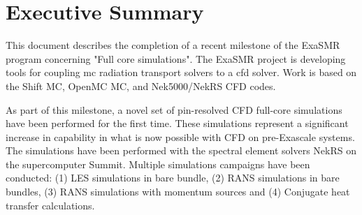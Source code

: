 
\section*{Executive Summary}

This document describes the completion of a recent  milestone of the ExaSMR program concerning  "Full core simulations". The ExaSMR project is developing tools for coupling \acf{mc} radiation
transport solvers to a \acf{cfd} solver.  Work is based on the Shift MC, OpenMC MC, and Nek5000/NekRS CFD codes.

As part of this milestone, a novel set of pin-resolved CFD full-core simulations have been performed for the first time. These simulations represent a significant increase in capability in what is now possible with CFD on pre-Exascale systems. The simulations have been performed with the spectral element solvers NekRS on the supercomputer Summit. Multiple simulations campaigns have been conducted: (1) LES simulations in bare bundle, (2) RANS simulations in bare bundles, (3) RANS simulations with momentum sources and (4) Conjugate heat transfer calculations.
